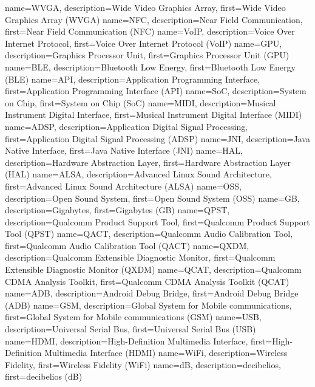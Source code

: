 {
  name={WVGA},
  description={Wide Video Graphics Array},
  first={Wide Video Graphics Array (WVGA)}
}
{
	name={NFC},
	description={Near Field Communication},
	first={Near Field Communication (NFC)}
}
{
	name={VoIP},
	description={Voice Over Internet Protocol},
	first={Voice Over Internet Protocol (VoIP)}
}
{
	name={GPU},
	description={Graphics Processor Unit},
	first={Graphics Processor Unit (GPU)}
}
{
	name={BLE},
	description={Bluetooth Low Energy},
	first={Bluetooth Low Energy (BLE)}
}
{
	name={API},
	description={Application Programming Interface},
	first={Application Programming Interface (API)}
}
{
	name={SoC},
	description={System on Chip},
	first={System on Chip (SoC)}
}
{
	name={MIDI},
	description={Musical Instrument Digital Interface},
	first={Musical Instrument Digital Interface (MIDI)}
}
{
	name={ADSP},
	description={Application Digital Signal Processing},
	first={Application Digital Signal Processing (ADSP)}
}
{
	name={JNI},
	description={Java Native Interface},
	first={Java Native Interface (JNI)}
}
{
	name={HAL},
	description={Hardware Abstraction Layer},
	first={Hardware Abstraction Layer (HAL)}
}
{
	name={ALSA},
	description={Advanced Linux Sound Architecture},
	first={Advanced Linux Sound Architecture (ALSA)}
}
{
	name={OSS},
	description={Open Sound System},
	first={Open Sound System (OSS)}
}
{
	name={GB},
	description={Gigabytes},
	first={Gigabytes (GB)}
}
{
	name={QPST},
	description={Qualcomm Product Support Tool},
	first={Qualcomm Product Support Tool (QPST)}
}
{
	name={QACT},
	description={Qualcomm Audio Calibration Tool},
	first={Qualcomm Audio Calibration Tool (QACT)}
}
{
	name={QXDM},
	description={Qualcomm Extensible Diagnostic Monitor},
	first={Qualcomm Extensible Diagnostic Monitor (QXDM)}
}
{
	name={QCAT},
	description={Qualcomm CDMA Analysis Toolkit},
	first={Qualcomm CDMA Analysis Toolkit (QCAT)}
}
{
	name={ADB},
	description={Android Debug Bridge},
	first={Android Debug Bridge (ADB)}
}
{	
	name={GSM},
	description={Global System for Mobile communications},
	first={Global System for Mobile communications (GSM)}
}
{	
	name={USB},
	description={Universal Serial Bus},
	first={Universal Serial Bus (USB)}
}
{	
	name={HDMI},
	description={High-Definition Multimedia Interface},
	first={High-Definition Multimedia Interface (HDMI)}
}
{	
	name={WiFi},
	description={Wireless Fidelity},
	first={Wireless Fidelity (WiFi)}
}
{
	name={dB},
	description={decibelios},
	first={decibelios (dB)}
}
